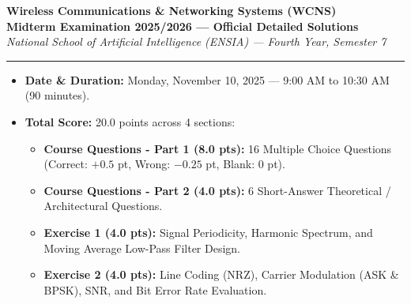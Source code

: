 \documentclass[10pt,a4paper]{article}
\begin{document}
\begin{center}
    {\LARGE\bfseries\color{themeblue} Wireless Communications \& Networking Systems (WCNS)}\\[2pt]
    {\large\bfseries\color{themeblue} Midterm Examination 2025/2026 --- Official Detailed Solutions}\\[2pt]
    {\small\itshape National School of Artificial Intelligence (ENSIA) --- Fourth Year, Semester 7}\\[2pt]
    \textcolor{themeblue}{\rule{\textwidth}{0.6pt}}
\end{center}

\vspace{-8pt}

\begin{tcolorbox}[
    colframe=themeblue,
    colback=lightbg,
    coltitle=white,
    fonttitle=\bfseries\sffamily\small,
    title={Exam Metadata \& Structure},
    arc=1.4mm,
    boxrule=0.6pt,
    left=6pt, right=6pt, top=3pt, bottom=3pt
]
\footnotesize
\begin{itemize}[leftmargin=12pt, itemsep=1pt, topsep=1pt]
    \item \textbf{Date \& Duration:} Monday, November 10, 2025 --- 9:00 AM to 10:30 AM (90 minutes).
    \item \textbf{Total Score:} 20.0 points across 4 sections:
    \begin{itemize}[leftmargin=10pt, itemsep=0.5pt]
        \item \textbf{Course Questions - Part 1 (8.0 pts):} 16 Multiple Choice Questions (Correct: $+0.5$ pt, Wrong: $-0.25$ pt, Blank: $0$ pt).
        \item \textbf{Course Questions - Part 2 (4.0 pts):} 6 Short-Answer Theoretical / Architectural Questions.
        \item \textbf{Exercise 1 (4.0 pts):} Signal Periodicity, Harmonic Spectrum, and Moving Average Low-Pass Filter Design.
        \item \textbf{Exercise 2 (4.0 pts):} Line Coding (NRZ), Carrier Modulation (ASK \& BPSK), SNR, and Bit Error Rate Evaluation.
    \end{itemize}
\end{itemize}
\end{tcolorbox}

\vspace{1pt}

\par\vspace{2pt}
\end{document}
